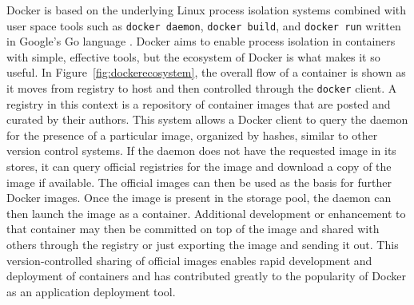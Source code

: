 Docker is based on the underlying Linux process isolation systems combined with user space tools such as \texttt{docker daemon}, \texttt{docker build}, and \texttt{docker run} written in Google's Go language \autocite{dockerarch1}. 
Docker aims to enable process isolation in containers with simple, effective tools, but the ecosystem of Docker is what makes it so useful.  
In Figure~\ref{fig:dockerecosystem}, the overall flow of a container is shown as it moves from registry to host and then controlled through the \texttt{docker} client.  
A registry in this context is a repository of container images that are posted and curated by their authors.
This system allows a Docker client to query the daemon for the presence of a particular image, organized by hashes, similar to other version control systems.  
If the daemon does not have the requested image in its stores, it can query official registries for the image and download a copy of the image if available.  
The official images can then be used as the basis for further Docker images. 
Once the image is present in the storage pool, the daemon can then launch the image as a container.  
Additional development or enhancement to that container may then be committed on top of the image and shared with others through the registry or just exporting the image and sending it out.  
This version-controlled sharing of official images enables rapid development and deployment of containers and has contributed greatly to the popularity of Docker as an application deployment tool.

